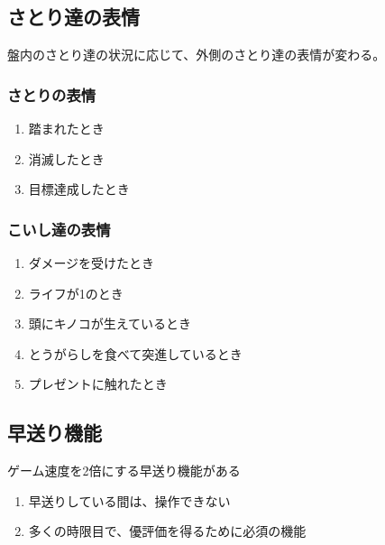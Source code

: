 \subsection{さとり達の表情}
盤内のさとり達の状況に応じて、外側のさとり達の表情が変わる。

\subsubsection{さとりの表情}
\begin{enumerate}[label={\sarrow}]
\item 踏まれたとき
\item 消滅したとき
\item 目標達成したとき
\end{enumerate}

\subsubsection{こいし達の表情}
\begin{enumerate}[label={\sarrow}]
\item ダメージを受けたとき
\item ライフが1のとき
\item 頭にキノコが生えているとき
\item とうがらしを食べて突進しているとき
\item プレゼントに触れたとき
\end{enumerate}


\subsection{早送り機能}
ゲーム速度を2倍にする早送り機能がある
\begin{enumerate}[label={\sarrow}]
\item 早送りしている間は、操作できない
\item 多くの時限目で、優評価を得るために必須の機能
\end{enumerate}




